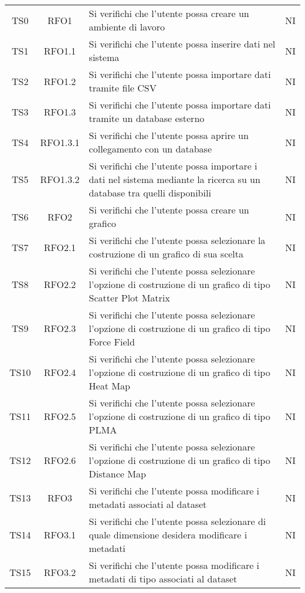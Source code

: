 \documentclass[../piano_di_qualifica.tex]{subfiles}
\begin{document}
\begin{center}
\begin{longtable}{|c|c|p{8cm}|c|}
		\endlastfoot
		TS0   & RFO1            & Si verifichi che l'utente possa creare un ambiente di lavoro     & NI                         \\
		TS1   & RFO1.1          & Si verifichi che l'utente possa inserire dati nel sistema & NI                         \\
		TS2   & RFO1.2 			& Si verifichi che l'utente possa importare dati tramite file CSV         & NI                         \\
		TS3   & RFO1.3          & Si verifichi che l'utente possa importare dati tramite un database esterno   & NI                  \\
		TS4   & RFO1.3.1      	& Si verifichi che l'utente possa aprire un collegamento con un database & NI                         \\
		TS5   & RFO1.3.2      	& Si verifichi che l'utente possa importare i dati nel sistema mediante la ricerca su un database tra quelli disponibili & NI  \\
		TS6   & RFO2      		& Si verifichi che l'utente possa creare  un grafico & NI  \\
		TS7   & RFO2.1      	& Si verifichi che l'utente possa selezionare la costruzione di un grafico di sua scelta & NI  \\
		TS8   & RFO2.2      	& Si verifichi che l'utente possa selezionare l'opzione di costruzione di un grafico di tipo Scatter Plot Matrix & NI  \\
		TS9   & RFO2.3     		& Si verifichi che l'utente possa selezionare l'opzione di costruzione di un grafico di tipo Force Field & NI  \\
		TS10  & RFO2.4     		& Si verifichi che l'utente possa selezionare l'opzione di costruzione di un grafico di tipo Heat Map & NI  \\
		TS11  & RFO2.5     		& Si verifichi che l'utente possa selezionare l'opzione di costruzione di un grafico di tipo PLMA & NI \\
		TS12  & RFO2.6     		& Si verifichi che l'utente possa selezionare l'opzione di costruzione di un grafico di tipo Distance Map & NI \\
		TS13  & RFO3     		& Si verifichi che l'utente possa modificare i metadati associati al dataset & NI \\
		TS14  & RFO3.1     		& Si verifichi che l'utente possa selezionare di quale dimensione desidera modificare i metadati & NI \\
		TS15  & RFO3.2     		& Si verifichi che l'utente possa modificare i metadati di tipo associati al dataset & NI \\

\end{longtable}
\end{center}
\end{document}
